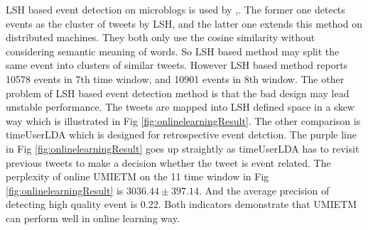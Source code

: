 \documentclass{llncs}
\begin{document}
LSH based event detection on microblogs is used by \cite{petrovic2010streaming},\cite{mccreadiescalable}. 
The former one detects events as the cluster of tweets by LSH, and the latter one extends this method on distributed machines. 
They both only use the cosine similarity without considering semantic meaning of words. 
So LSH based method may split the same event into clusters of similar tweets.
However LSH based method reports 10578 events in 7th time window, and 10901 events in 8th window. 
The other problem of LSH based event detection method is that the bad design may lead unstable performance. 
The tweets are mapped into LSH defined space in a skew way which is illustrated in Fig \ref{fig:onlinelearningResult}.
The other comparison is timeUserLDA\cite{timeUserLDA2012finding} which is designed for retrospective event detction. 
The purple line in Fig \ref{fig:onlinelearningResult} goes up straightly as timeUserLDA has to revisit previous tweets to make a decision whether the tweet is event related. 
The perplexity of online UMIETM on the 11 time window in Fig \ref{fig:onlinelearningResult} is \(3036.44\pm397.14\). 
And the average precision of detecting high quality event is 0.22.
Both indicators demonstrate that UMIETM can perform well in online learning way. 

\end{document}

